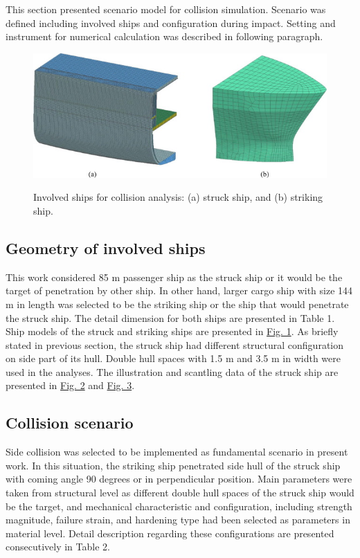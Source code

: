 \documentclass[../Final.tex]{subfiles}
\begin{document}
This section presented scenario model for collision simulation. 
Scenario was defined including involved ships and configuration during impact. Setting and instrument for numerical calculation was described in following paragraph. 

\begin{figure}[h]
    \centering
    \includegraphics[width=\textwidth]{fig1.jpg}
    \label{fig1}
    \caption{Involved ships for collision analysis: (a) struck ship, and (b) striking ship.}
\end{figure}

\subsection{Geometry of involved ships}

This work considered 85 m passenger ship as the struck ship or it would be the target of penetration by other ship. 
In other hand, larger cargo ship with size 144 m in length was selected to be the striking ship or the ship that would penetrate the struck ship. 
The detail dimension for both ships are presented in Table 1. Ship models of the struck and striking ships are presented in \hyperref[fig1]{Fig. 1}. 
As briefly stated in previous section, the struck ship had different structural configuration on side part of its hull. Double hull spaces with 1.5 m and 3.5 m in width were used in the analyses. 
The illustration and scantling data of the struck ship are presented in \hyperref[fig2]{Fig. 2} and \hyperref[fig3]{Fig. 3}. 

\subsection{Collision scenario}

Side collision was selected to be implemented as fundamental scenario in present work. 
In this situation, the striking ship penetrated side hull of the struck ship with coming angle 90 degrees or in perpendicular position. 
Main parameters were taken from structural level as different double hull spaces of the struck ship would be the target, and mechanical character­istic and configuration, including strength magnitude, 
failure strain, and hardening type had been selected as parameters in material level. Detail description regarding these configurations are presented consecutively in Table 2. 
\end{document}
